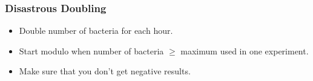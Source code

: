 \begin{frame}
    \frametitle{Disastrous Doubling}
    \begin{itemize}
        \item Double number of bacteria for each hour.
        \item Start modulo when number of bacteria $\ge$ maximum used in one experiment.
        \item Make sure that you don't get negative results.
    \end{itemize}
\end{frame}

